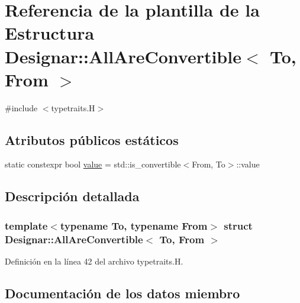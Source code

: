 \hypertarget{struct_designar_1_1_all_are_convertible_3_01_to_00_01_from_01_4}{}\section{Referencia de la plantilla de la Estructura Designar\+:\+:All\+Are\+Convertible$<$ To, From $>$}
\label{struct_designar_1_1_all_are_convertible_3_01_to_00_01_from_01_4}


{\ttfamily \#include $<$typetraits.\+H$>$}

\subsection*{Atributos públicos estáticos}
\begin{DoxyCompactItemize}
\item 
static constexpr bool \hyperlink{struct_designar_1_1_all_are_convertible_3_01_to_00_01_from_01_4_a64662370d25f46762af5c4adc6a01a84}{value} = std\+::is\+\_\+convertible$<$From, To$>$\+::value
\end{DoxyCompactItemize}


\subsection{Descripción detallada}
\subsubsection*{template$<$typename To, typename From$>$\newline
struct Designar\+::\+All\+Are\+Convertible$<$ To, From $>$}



Definición en la línea 42 del archivo typetraits.\+H.



\subsection{Documentación de los datos miembro}
\mbox{\label{struct_designar_1_1_all_are_convertible_3_01_to_00_01_from_01_4_a64662370d25f46762af5c4adc6a01a84}} 
